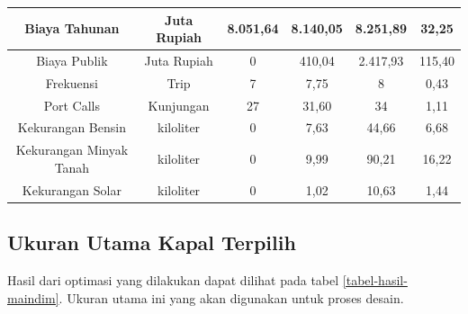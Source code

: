 \begin{table}[!ht]
\begin{tabular}{|cccccc|}
    \multicolumn{1}{|c|}{Biaya Tahunan}           & \multicolumn{1}{c|}{Juta Rupiah} & \multicolumn{1}{c|}{8.051,64} & \multicolumn{1}{c|}{8.140,05} & \multicolumn{1}{c|}{8.251,89} & 32,25     \\ \hline
    \multicolumn{1}{|c|}{Biaya Publik}            & \multicolumn{1}{c|}{Juta Rupiah} & \multicolumn{1}{c|}{0}        & \multicolumn{1}{c|}{410,04}   & \multicolumn{1}{c|}{2.417,93} & 115,40    \\ \hline
    \multicolumn{1}{|c|}{Frekuensi}               & \multicolumn{1}{c|}{Trip}        & \multicolumn{1}{c|}{7}        & \multicolumn{1}{c|}{7,75}     & \multicolumn{1}{c|}{8}        & 0,43      \\ \hline
    \multicolumn{1}{|c|}{Port Calls}              & \multicolumn{1}{c|}{Kunjungan}   & \multicolumn{1}{c|}{27}       & \multicolumn{1}{c|}{31,60}    & \multicolumn{1}{c|}{34}       & 1,11      \\ \hline
    \multicolumn{1}{|c|}{Kekurangan Bensin}       & \multicolumn{1}{c|}{kiloliter}   & \multicolumn{1}{c|}{0}        & \multicolumn{1}{c|}{7,63}     & \multicolumn{1}{c|}{44,66}    & 6,68      \\ \hline
    \multicolumn{1}{|c|}{Kekurangan Minyak Tanah} & \multicolumn{1}{c|}{kiloliter}   & \multicolumn{1}{c|}{0}        & \multicolumn{1}{c|}{9,99}     & \multicolumn{1}{c|}{90,21}    & 16,22     \\ \hline
    \multicolumn{1}{|c|}{Kekurangan Solar}        & \multicolumn{1}{c|}{kiloliter}   & \multicolumn{1}{c|}{0}        & \multicolumn{1}{c|}{1,02}     & \multicolumn{1}{c|}{10,63}    & 1,44      \\ \hline
    \end{tabular}
    \end{table}


\subsection{Ukuran Utama Kapal Terpilih}
\label{subsec:ukuran-utama}

Hasil dari optimasi yang dilakukan dapat dilihat pada tabel \ref{tabel-hasil-maindim}. Ukuran utama ini yang akan digunakan untuk proses desain.

